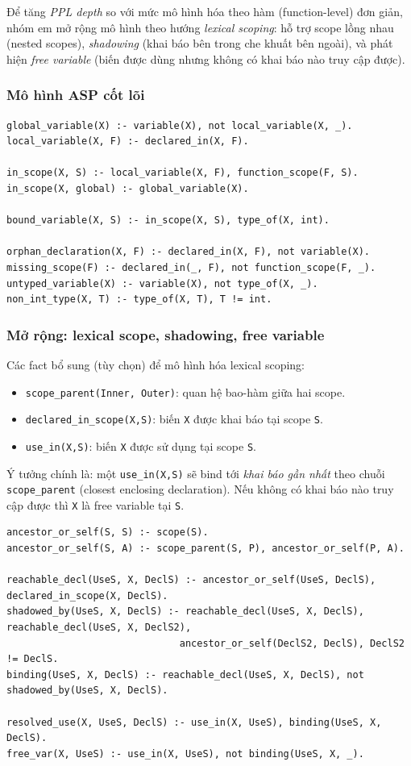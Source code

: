 ﻿\documentclass[11pt,a4paper]{article}
\begin{document}
Để tăng \textit{PPL depth} so với mức mô hình hóa theo hàm (function-level) đơn giản, nhóm em mở rộng mô hình theo hướng \textit{lexical scoping}: hỗ trợ scope lồng nhau (nested scopes), \textit{shadowing} (khai báo bên trong che khuất bên ngoài), và phát hiện \textit{free variable} (biến được dùng nhưng không có khai báo nào truy cập được).

\subsubsection*{Mô hình ASP cốt lõi}
\begin{lstlisting}[language={}]
global_variable(X) :- variable(X), not local_variable(X, _).
local_variable(X, F) :- declared_in(X, F).

in_scope(X, S) :- local_variable(X, F), function_scope(F, S).
in_scope(X, global) :- global_variable(X).

bound_variable(X, S) :- in_scope(X, S), type_of(X, int).

orphan_declaration(X, F) :- declared_in(X, F), not variable(X).
missing_scope(F) :- declared_in(_, F), not function_scope(F, _).
untyped_variable(X) :- variable(X), not type_of(X, _).
non_int_type(X, T) :- type_of(X, T), T != int.
\end{lstlisting}

\subsubsection*{Mở rộng: lexical scope, shadowing, free variable}
Các fact bổ sung (tùy chọn) để mô hình hóa lexical scoping:
\begin{itemize}[leftmargin=1.5em]
  \item \texttt{scope\_parent(Inner, Outer)}: quan hệ bao-hàm giữa hai scope.
  \item \texttt{declared\_in\_scope(X,S)}: biến \texttt{X} được khai báo tại scope \texttt{S}.
  \item \texttt{use\_in(X,S)}: biến \texttt{X} được sử dụng tại scope \texttt{S}.
\end{itemize}

Ý tưởng chính là: một \texttt{use\_in(X,S)} sẽ bind tới \textit{khai báo gần nhất} theo chuỗi \texttt{scope\_parent} (closest enclosing declaration). Nếu không có khai báo nào truy cập được thì \texttt{X} là free variable tại \texttt{S}.

\begin{lstlisting}[language={}]
ancestor_or_self(S, S) :- scope(S).
ancestor_or_self(S, A) :- scope_parent(S, P), ancestor_or_self(P, A).

reachable_decl(UseS, X, DeclS) :- ancestor_or_self(UseS, DeclS), declared_in_scope(X, DeclS).
shadowed_by(UseS, X, DeclS) :- reachable_decl(UseS, X, DeclS), reachable_decl(UseS, X, DeclS2),
                              ancestor_or_self(DeclS2, DeclS), DeclS2 != DeclS.
binding(UseS, X, DeclS) :- reachable_decl(UseS, X, DeclS), not shadowed_by(UseS, X, DeclS).

resolved_use(X, UseS, DeclS) :- use_in(X, UseS), binding(UseS, X, DeclS).
free_var(X, UseS) :- use_in(X, UseS), not binding(UseS, X, _).
\end{lstlisting}
\end{document}
